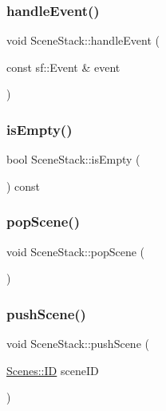 \subsubsection{\texorpdfstring{handle\+Event()}{handleEvent()}}
{\footnotesize\ttfamily void Scene\+Stack\+::handle\+Event (\begin{DoxyParamCaption}\item[{const sf\+::\+Event \&}]{event }\end{DoxyParamCaption})}

\mbox{\label{class_scene_stack_ade95cce69229a18d169f63093289e865}} 
\subsubsection{\texorpdfstring{is\+Empty()}{isEmpty()}}
{\footnotesize\ttfamily bool Scene\+Stack\+::is\+Empty (\begin{DoxyParamCaption}{ }\end{DoxyParamCaption}) const}

\mbox{\label{class_scene_stack_a0ea3309f9ec9120cf51a0bce3881e1e2}} 
\subsubsection{\texorpdfstring{pop\+Scene()}{popScene()}}
{\footnotesize\ttfamily void Scene\+Stack\+::pop\+Scene (\begin{DoxyParamCaption}{ }\end{DoxyParamCaption})}

\mbox{\label{class_scene_stack_a41366819a998558e3920fe7859d1f114}} 
\subsubsection{\texorpdfstring{push\+Scene()}{pushScene()}}
{\footnotesize\ttfamily void Scene\+Stack\+::push\+Scene (\begin{DoxyParamCaption}\item[{\hyperlink{namespace_scenes_a0ad7ab6856b1d77d498e3a251f6bb275}{Scenes\+::\+ID}}]{scene\+ID }\end{DoxyParamCaption})}

